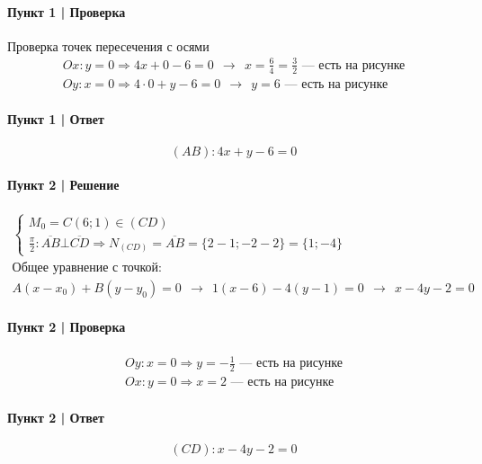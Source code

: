 \documentclass{article}
\begin{document}
\paragraph{Пункт 1 | Проверка}
Проверка точек пересечения с осями
\begin{gather*}
    Ox: y = 0 \Rightarrow 4x + 0 - 6 = 0 ~~\rightarrow~~ x = \frac{6}{4} = \frac{3}{2} \text{ --- есть на рисунке} \\
    Oy: x = 0 \Rightarrow 4 \cdot 0 + y - 6 = 0 ~~\rightarrow~~ y = 6 \text{ --- есть на рисунке}
\end{gather*}

\paragraph{Пункт 1 | Ответ}
\[
    (AB): 4x + y - 6 = 0
\]

\paragraph{Пункт 2 | Решение}
\begin{gather*}
    \begin{cases}
        M_0 = C(6; 1) \in (CD) \\
        \frac{\pi}{2}: \overline{AB} \bot \overline{CD} \Rightarrow N_{(CD)} = \overline{AB} = \{2 - 1; -2 - 2\} = \{1; -4\}
    \end{cases} \\
    \text{Общее уравнение с точкой: } \\
    A(x - x_0) + B(y - y_0) = 0 ~~\rightarrow~~
    1(x - 6) - 4(y - 1) = 0 ~~\rightarrow~~
    \boxed{x - 4y - 2 = 0}
\end{gather*}

\paragraph{Пункт 2 | Проверка}
\begin{gather*}
    Oy: x = 0 \Rightarrow y = -\frac{1}{2} \text{ --- есть на рисунке} \\
    Ox: y = 0 \Rightarrow x = 2 \text{ --- есть на рисунке}
\end{gather*}

\paragraph{Пункт 2 | Ответ}
\[
    (CD): x - 4y - 2 = 0
\]
\end{document}

